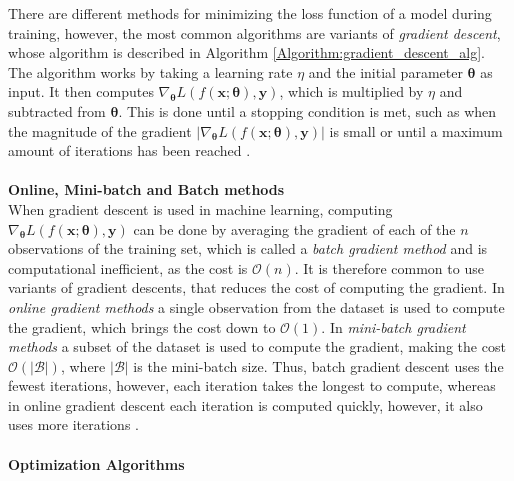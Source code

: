 \documentclass[./main.tex]{subfiles}
\begin{document}
\newline
There are different methods for minimizing the loss function of a model during training, however, the most common algorithms are variants of \textit{gradient descent}, whose algorithm is described in Algorithm \ref{Algorithm:gradient_descent_alg}. The algorithm works by taking a learning rate $\eta$ and the initial parameter $\bm{\theta}$ as input. It then computes $\nabla_{\bm{\theta}} L\left( f(\bm{x}; \bm{\theta}), \bm{y} \right)$, which is multiplied by $\eta$ and  subtracted from $\bm{\theta}$. This is done until a stopping condition is met, such as when the magnitude of the gradient $\left|  \nabla_{\bm{\theta}} L\left( f(\bm{x}; \bm{\theta}), \bm{y} \right) \right|$ is small or until a maximum amount of iterations has been reached \cite{d2l}.
\\
\\
\noindent \textbf{Online, Mini-batch and Batch methods} \\
\noindent When gradient descent is used in machine learning, computing $\nabla_{\bm{\theta}} L\left( f(\bm{x}; \bm{\theta}), \bm{y} \right)$ can be done by averaging the gradient of each of the $n$ observations of the training set, which is called a \textit{batch gradient method} and is computational inefficient, as the cost is $\mathcal{O}(n)$. It is therefore common to use variants of gradient descents, that reduces the cost of computing the gradient. In \textit{online gradient methods} a single observation from the dataset is used to compute the gradient, which brings the cost down to $\mathcal{O}(1)$. In \textit{mini-batch gradient methods} a subset of the dataset is used to compute the gradient, making the cost $\mathcal{O}(|\mathcal{B}|)$, where $|\mathcal{B}|$ is the mini-batch size. Thus, batch gradient descent uses the fewest iterations, however, each iteration takes the longest to compute, whereas in online gradient descent each iteration is computed quickly, however, it also uses more iterations  \cite{d2l}.
\\
\\
\noindent \textbf{Optimization Algorithms}\\
\end{document}
